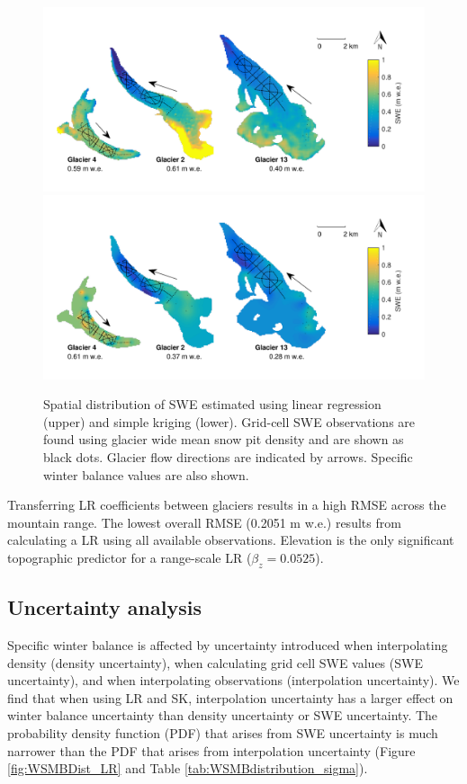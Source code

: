 \documentclass[review,oneside, letterpaper]{igs}
\begin{document}
\begin{figure}
	\centering
	\includegraphics[width =\textwidth]{LR_map.pdf}\\
		\vspace{-16 mm}
    \includegraphics[width =\textwidth]{SK_map.pdf}\\
	\caption{Spatial distribution of SWE estimated using linear regression (upper) and simple kriging (lower). Grid-cell SWE observations are found using glacier wide mean snow pit density and are shown as black dots. Glacier flow directions are indicated by arrows. Specific winter balance values are also shown.}
	\label{fig:LR_SK_map}
\end{figure}

Transferring LR coefficients between glaciers results in a high RMSE across the mountain range. The lowest overall RMSE (0.2051 m w.e.) results from calculating a LR using all available observations. Elevation is the only significant topographic predictor for a range-scale LR ($\beta_z=0.0525$).

\subsection{Uncertainty analysis}

Specific winter balance is affected by uncertainty introduced when interpolating density (density uncertainty), when calculating grid cell SWE values (SWE uncertainty), and when interpolating observations (interpolation uncertainty). We find that when using LR and SK, interpolation uncertainty has a larger effect on winter balance uncertainty than density uncertainty or SWE uncertainty. The probability density function (PDF) that arises from SWE uncertainty is much narrower than the PDF that arises from interpolation uncertainty (Figure \ref{fig:WSMBDist_LR} and Table \ref{tab:WSMBdistribution_sigma}).
\end{document}
